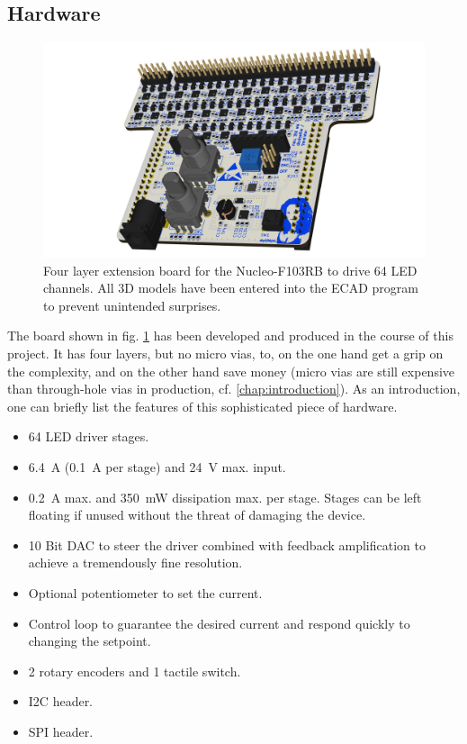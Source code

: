 \subsection{Hardware}
\label{subsec:uv_light_hw}
\begin{figure}[H]                                                         
\centering          
\includegraphics[width=1\textwidth]{./fig/3d_pic_pcb}   
\caption[Four layer extension board for the Nucleo-F103RB.]{Four layer extension board for the Nucleo-F103RB to drive 64 \gls{LED} channels. All 3D models have been entered into the \gls{ECAD} program to prevent unintended surprises.}   
\label{fig:3d_pic_pcb}                                                       
\end{figure}  
The board shown in fig. \ref{fig:3d_pic_pcb} has been developed and produced in the course of this project. It has four layers, but no micro vias, to, on the one hand get a grip on the complexity, and on the other hand save money (micro vias are still expensive than through-hole vias in production, cf. \ref{chap:introduction}). As an introduction, one can briefly list the features of this sophisticated piece of hardware.
\begin{itemize}
\item 64 \gls{LED} driver stages.
\item \SI{6.4}{\ampere} (\SI{0.1}{\ampere} per stage) and \SI{24}{\volt} max. input. 
\item \SI{0.2}{\ampere} max. and \SI{350}{\milli\watt} dissipation max. per stage. Stages can be left floating if unused without the threat of damaging the device. 
\item 10 Bit \gls{DAC} to steer the driver combined with feedback amplification to achieve a tremendously fine resolution. 
\item Optional potentiometer to set the current. 
\item Control loop to guarantee the desired current and respond quickly to changing the setpoint. 
\item 2 rotary encoders and 1 tactile switch.
\item \gls{I2C} header.
\item \gls{SPI} header. 
\end{itemize}

